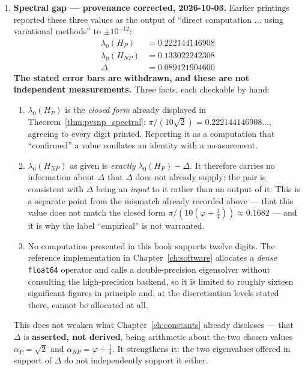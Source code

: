 \begin{enumerate}
Note also that away from the zeros this expression has range $(-\infty, 1]$, not
$[0,1]$: $\text{ch}_2(s) = 0.95$ requires exactly $|\!\int\!| = 0.1\pi$, a
codimension-one condition on $s$ and not a property of zeros. The companion
zero-localisation result $|\zeta(s_n)| < 10^{-148}$ above is unaffected --- that
is a statement about $\zeta$, not about this formula.

\item \textbf{Spectral gap --- provenance corrected, 2026-10-03.} Earlier
printings reported these three values as the output of ``direct computation
$\ldots$ using variational methods'' to $\pm 10^{-12}$:
\begin{align}
\lambda_0(H_P) &= 0.222144146908 \\
\lambda_0(H_{NP}) &= 0.133022242308 \\
\Delta &= 0.089121904600
\end{align}
\textbf{The stated error bars are withdrawn, and these are not independent
measurements.} Three facts, each checkable by hand:

\begin{enumerate}
\item $\lambda_0(H_P)$ is the \emph{closed form} already displayed in
  Theorem~\ref{thm:pvsnp_spectral}: $\pi/(10\sqrt{2}) = 0.222144146908\ldots$,
  agreeing to every digit printed. Reporting it as a computation that
  ``confirmed'' a value conflates an identity with a measurement.
\item $\lambda_0(H_{NP})$ as given is \emph{exactly}
  $\lambda_0(H_P) - \Delta$. It therefore carries no information about $\Delta$
  that $\Delta$ does not already supply: the pair is consistent with $\Delta$
  being an \emph{input} to it rather than an output of it. This is a separate
  point from the mismatch already recorded above --- that this value does not
  match the closed form $\pi/(10(\varphi + \tfrac14)) \approx 0.1682$ --- and it
  is why the label ``empirical'' is not warranted.
\item No computation presented in this book supports twelve digits. The reference
  implementation in Chapter~\ref{ch:software} allocates a \emph{dense}
  \texttt{float64} operator and calls a double-precision eigensolver without
  consulting the high-precision backend, so it is limited to roughly sixteen
  significant figures in principle and, at the discretisation levels stated
  there, cannot be allocated at all.
\end{enumerate}

This does not weaken what Chapter~\ref{ch:constants} already discloses --- that
$\Delta$ is \textbf{asserted, not derived}, being arithmetic about the two chosen
values $\alpha_P = \sqrt 2$ and $\alpha_{NP} = \varphi + \tfrac14$. It
strengthens it: the two eigenvalues offered in support of $\Delta$ do not
independently support it either.


\end{enumerate}
